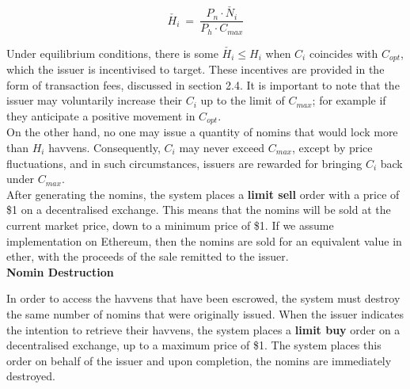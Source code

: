 \begin{equation}
\check{H_i} \ = \ \frac{P_n \cdot \check{N_i}}{P_h \cdot C_{max}}  \label{eq:escrowed}
\end{equation}

\vspace{2 mm}

\noindent Under equilibrium conditions, there is some \(\check{H_i} \leq H_i\)
when \(C_i\) coincides with \(C_{opt}\), which the issuer is incentivised to
target. These incentives are provided in the form of transaction fees,
discussed in section 2.4. It is important to note that the issuer may
voluntarily increase their \(C_i\) up to the limit of \(C_{max}\); for example if
they anticipate a positive movement in \(C_{opt}\). \\

\noindent On the other hand, no one may issue a quantity of nomins
that would lock more than \(H_i\) havvens. Consequently, \(C_i\) may never exceed
\(C_{max}\), except by price fluctuations, and in such circumstances, issuers
are rewarded for bringing \(C_i\) back under \(C_{max}\). \\

\noindent After generating the nomins, the system places a \textbf{limit
sell} order with a price of \$1 on a decentralised exchange. This means that
the nomins will be sold at the current market price, down to a minimum price
of \$1. If we assume implementation on Ethereum, then the nomins are sold for
an equivalent value in ether, with the proceeds of the sale remitted to the
issuer. \\

\noindent \textbf{Nomin Destruction}

\vspace{1mm}

\noindent In order to access the havvens that have been escrowed, the system
must destroy the same number of nomins that were originally issued. When the
issuer indicates the intention to retrieve their havvens, the system places a
\textbf{limit buy} order on a decentralised exchange, up to a maximum price
of \$1. The system places this order on behalf of the issuer and upon
completion, the nomins are immediately destroyed. \\
